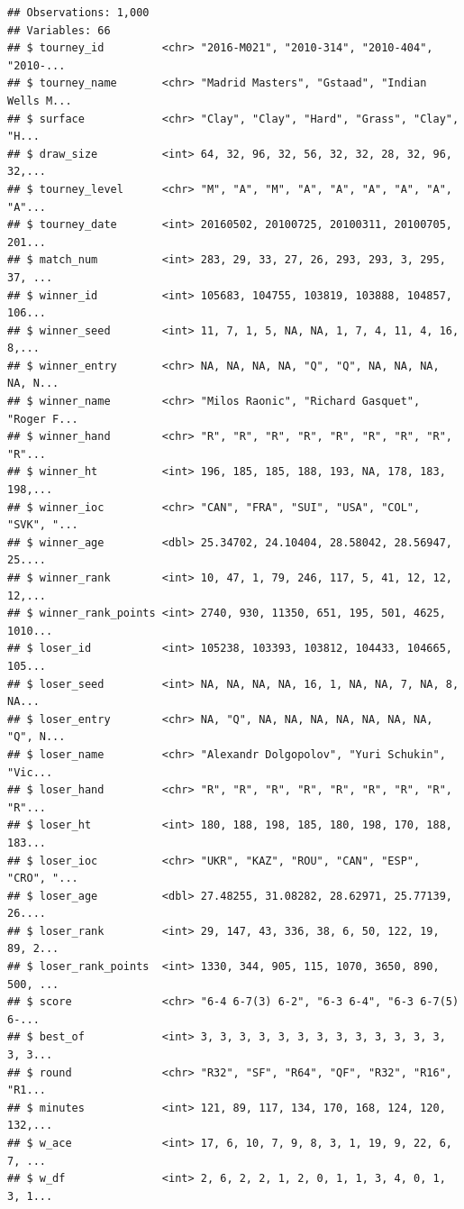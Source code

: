 \documentclass[]{article}
\begin{document}
\begin{verbatim}
## Observations: 1,000
## Variables: 66
## $ tourney_id         <chr> "2016-M021", "2010-314", "2010-404", "2010-...
## $ tourney_name       <chr> "Madrid Masters", "Gstaad", "Indian Wells M...
## $ surface            <chr> "Clay", "Clay", "Hard", "Grass", "Clay", "H...
## $ draw_size          <int> 64, 32, 96, 32, 56, 32, 32, 28, 32, 96, 32,...
## $ tourney_level      <chr> "M", "A", "M", "A", "A", "A", "A", "A", "A"...
## $ tourney_date       <int> 20160502, 20100725, 20100311, 20100705, 201...
## $ match_num          <int> 283, 29, 33, 27, 26, 293, 293, 3, 295, 37, ...
## $ winner_id          <int> 105683, 104755, 103819, 103888, 104857, 106...
## $ winner_seed        <int> 11, 7, 1, 5, NA, NA, 1, 7, 4, 11, 4, 16, 8,...
## $ winner_entry       <chr> NA, NA, NA, NA, "Q", "Q", NA, NA, NA, NA, N...
## $ winner_name        <chr> "Milos Raonic", "Richard Gasquet", "Roger F...
## $ winner_hand        <chr> "R", "R", "R", "R", "R", "R", "R", "R", "R"...
## $ winner_ht          <int> 196, 185, 185, 188, 193, NA, 178, 183, 198,...
## $ winner_ioc         <chr> "CAN", "FRA", "SUI", "USA", "COL", "SVK", "...
## $ winner_age         <dbl> 25.34702, 24.10404, 28.58042, 28.56947, 25....
## $ winner_rank        <int> 10, 47, 1, 79, 246, 117, 5, 41, 12, 12, 12,...
## $ winner_rank_points <int> 2740, 930, 11350, 651, 195, 501, 4625, 1010...
## $ loser_id           <int> 105238, 103393, 103812, 104433, 104665, 105...
## $ loser_seed         <int> NA, NA, NA, NA, 16, 1, NA, NA, 7, NA, 8, NA...
## $ loser_entry        <chr> NA, "Q", NA, NA, NA, NA, NA, NA, NA, "Q", N...
## $ loser_name         <chr> "Alexandr Dolgopolov", "Yuri Schukin", "Vic...
## $ loser_hand         <chr> "R", "R", "R", "R", "R", "R", "R", "R", "R"...
## $ loser_ht           <int> 180, 188, 198, 185, 180, 198, 170, 188, 183...
## $ loser_ioc          <chr> "UKR", "KAZ", "ROU", "CAN", "ESP", "CRO", "...
## $ loser_age          <dbl> 27.48255, 31.08282, 28.62971, 25.77139, 26....
## $ loser_rank         <int> 29, 147, 43, 336, 38, 6, 50, 122, 19, 89, 2...
## $ loser_rank_points  <int> 1330, 344, 905, 115, 1070, 3650, 890, 500, ...
## $ score              <chr> "6-4 6-7(3) 6-2", "6-3 6-4", "6-3 6-7(5) 6-...
## $ best_of            <int> 3, 3, 3, 3, 3, 3, 3, 3, 3, 3, 3, 3, 3, 3, 3...
## $ round              <chr> "R32", "SF", "R64", "QF", "R32", "R16", "R1...
## $ minutes            <int> 121, 89, 117, 134, 170, 168, 124, 120, 132,...
## $ w_ace              <int> 17, 6, 10, 7, 9, 8, 3, 1, 19, 9, 22, 6, 7, ...
## $ w_df               <int> 2, 6, 2, 2, 1, 2, 0, 1, 1, 3, 4, 0, 1, 3, 1...

\end{verbatim}
\end{document}
